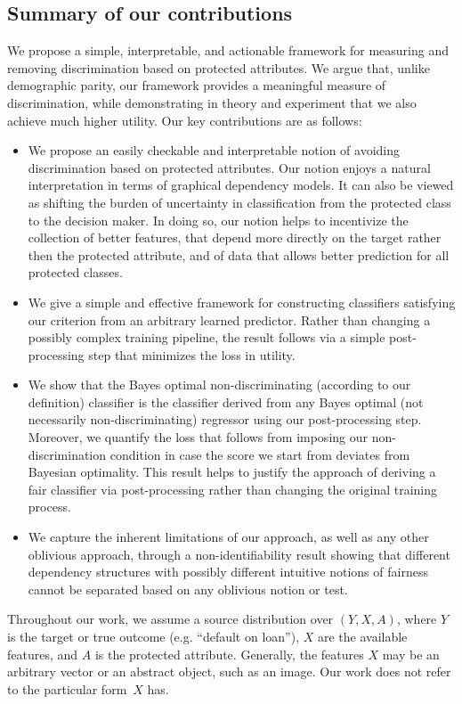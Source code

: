 \subsection{Summary of our contributions}
We propose a simple, interpretable, and actionable framework for measuring and
removing discrimination based on protected attributes. We argue that, unlike
demographic parity, our framework provides a meaningful measure of
discrimination, while demonstrating in theory and experiment that we also
achieve much higher utility.  Our key contributions are as follows:
%
\begin{itemize}
\item We propose an easily checkable and interpretable notion of
  avoiding discrimination based on protected attributes. Our notion
  enjoys a natural interpretation in terms of graphical dependency
  models.  It can also be viewed as shifting the burden of uncertainty
  in classification from the protected class to the decision maker. In
  doing so, our notion helps to incentivize the collection of better
  features, that depend more directly on the target rather then the
  protected attribute, and of data that allows better prediction for
  all protected classes.
%
\item
We give a simple and effective framework for constructing classifiers
satisfying our criterion from an arbitrary learned predictor. Rather than
changing a possibly complex training pipeline, the result follows via a simple
post-processing step that minimizes the loss in utility.
%
\item We show that the Bayes optimal non-discriminating (according to
  our definition) classifier is the classifier derived from any Bayes
  optimal (not necessarily non-discriminating) regressor using our
  post-processing step.  Moreover, we quantify the loss that follows
  from imposing our non-discrimination condition in case the score we
  start from deviates from Bayesian optimality. This result helps to
  justify the approach of deriving a fair classifier via
  post-processing rather than changing the original training process.
%
\item
We capture the inherent limitations of our approach, as well as any other
oblivious approach, through a non-identifiability result showing that different
dependency structures with possibly different intuitive notions of fairness
cannot be separated based on any oblivious notion or test.
\end{itemize}

Throughout our work, we assume a source distribution over $(Y,X,A)$, where $Y$
is the target or true outcome (e.g. ``default on loan''), $X$ are the available
features, and $A$ is the protected attribute. Generally, the features $X$ may be
an arbitrary vector or an abstract object, such as an image. Our work does not
refer to the particular form~$X$ has.

